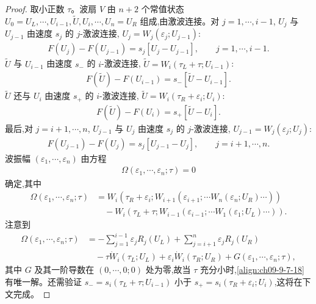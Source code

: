 \documentclass[../../main.tex]{subfiles}
\begin{document}
\begin{proof}
取小正数 $\tau$。波扇 $V$ 由 $n+2$ 个常值状态 $U_{0}=U_{L},\cdots ,U_{i-1},\tilde{U},U_{i},\cdots ,U_{n}=U_{R}$ 组成,由激波连接。对 $j=1,\cdots ,i-1$, $U_{j}$ 与 $U_{j-1}$ 由速度 $s_{j}$ 的 $j$-激波连接, $U_{j}=W_{j}(\varepsilon_{j};U_{j-1})$:
\begin{align}
F(U_{j})-F(U_{j-1})=s_{j}[U_{j}-U_{j-1}],\qquad j=1,\cdots ,i-1.
\label{align:ch09-9-7-14}
\end{align}
$\tilde{U}$ 与 $U_{i-1}$ 由速度 $s_{-}$ 的 $i$-激波连接, $\tilde{U}=W_{i}(\tau_{L}+\tau;U_{i-1})$:
\begin{align}
F(\tilde{U})-F(U_{i-1})=s_{-}[\tilde{U}-U_{i-1}].
\label{align:ch09-9-7-15}
\end{align}
$\tilde{U}$ 还与 $U_{i}$ 由速度 $s_{+}$ 的 $i$-激波连接, $\tilde{U}=W_{i}(\tau_{R}+\varepsilon_{i};U_{i})$:
\begin{align}
F(\tilde{U})-F(U_{i})=s_{+}[\tilde{U}-U_{i}].
\label{align:ch09-9-7-16}
\end{align}
最后,对 $j=i+1,\cdots ,n$, $U_{j-1}$ 与 $U_{j}$ 由速度 $s_{j}$ 的 $j$-激波连接, $U_{j-1}=W_{j}(\varepsilon_{j};U_{j})$:
\begin{align}
F(U_{j-1})-F(U_{j})=s_{j}[U_{j-1}-U_{j}],\qquad j=i+1,\cdots ,n.
\label{align:ch09-9-7-17}
\end{align}
波振幅 $(\varepsilon_{1},\cdots ,\varepsilon_{n})$ 由方程
\begin{align}
\Omega(\varepsilon_{1},\cdots ,\varepsilon_{n};\tau)=0
\label{align:ch09-9-7-18}
\end{align}
确定,其中
\begin{align}
\Omega(\varepsilon_{1},\cdots ,\varepsilon_{n};\tau)
&=W_{i}(\tau_{R}+\varepsilon_{i};W_{i+1}(\varepsilon_{i+1};\cdots W_{n}(\varepsilon_{n};U_{R})\cdots))
\nonumber\\
&\quad-W_{i}(\tau_{L}+\tau;W_{i-1}(\varepsilon_{i-1};\cdots W_{1}(\varepsilon_{1};U_{L})\cdots)).
\label{align:ch09-9-7-19}
\end{align}
注意到
\begin{align}
\Omega(\varepsilon_{1},\cdots ,\varepsilon_{n};\tau)
&=-\sum_{j=1}^{i-1}\varepsilon_{j}R_{j}(U_{L})+\sum_{j=i+1}^{n}\varepsilon_{j}R_{j}(U_{R})
\nonumber\\
&\quad-\tau\dot{W}_{i}(\tau_{L};U_{L})+\varepsilon_{i}\dot{W}_{i}(\tau_{R};U_{R})+G(\varepsilon_{1},\cdots ,\varepsilon_{n};\tau),
\label{align:ch09-9-7-20}
\end{align}
其中 $G$ 及其一阶导数在 $(0,\cdots ,0;0)$ 处为零,故当 $\tau$ 充分小时,\eqref{align:ch09-9-7-18}有唯一解。还需验证 $s_{-}=s_{i}(\tau_{L}+\tau;U_{i-1})$ 小于 $s_{+}=s_{i}(\tau_{R}+\varepsilon_{i};U_{i})$,这将在下文完成。


\end{proof}
\end{document}
